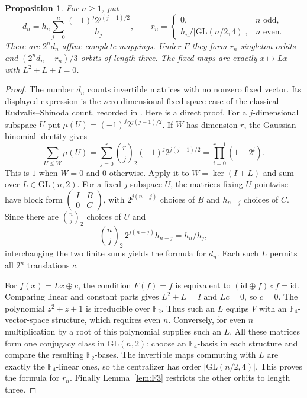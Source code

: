 \documentclass[11pt]{article}
\newtheorem{proposition}[theorem]{Proposition}
\begin{document}
\begin{proposition}\label{prop:F-affine}
For $n\ge1$, put
\[
d_n=h_n\sum_{j=0}^n\frac{(-1)^j2^{j(j-1)/2}}{h_j},\qquad
r_n=\begin{cases}
0,&n\text{ odd},\\
h_n/|\mathrm{GL}(n/2,4)|,&n\text{ even}.
\end{cases}
\]
There are $2^n d_n$ affine complete mappings.
Under $F$ they form $r_n$ singleton orbits and
$(2^n d_n-r_n)/3$ orbits of length three.
The fixed maps are exactly $x\mapsto Lx$ with $L^2+L+I=0$.
\end{proposition}
\begin{proof}
The number $d_n$ counts invertible matrices with no nonzero fixed vector.
Its displayed expression is the zero-dimensional fixed-space case of the
classical Rudvalis--Shinoda count, recorded in \cite[Theorem~2.1]{FS15}.
Here is a direct proof. For a $j$-dimensional subspace $U$ put
$\mu(U)=(-1)^j2^{j(j-1)/2}$. If $W$ has dimension $r$, the
Gaussian-binomial identity gives
\[
\sum_{U\le W}\mu(U)
=\sum_{j=0}^r\binom rj_2(-1)^j2^{j(j-1)/2}
=\prod_{i=0}^{r-1}(1-2^i).
\]
This is $1$ when $W=0$ and $0$ otherwise. Apply it to
$W=\ker(I+L)$ and sum over $L\in\mathrm{GL}(n,2)$.
For a fixed $j$-subspace $U$, the matrices fixing $U$ pointwise have block
form $\left(\begin{smallmatrix}I&B\\0&C\end{smallmatrix}\right)$,
with $2^{j(n-j)}$ choices of $B$ and $h_{n-j}$ choices of $C$.
Since there are $\binom nj_2$ choices of $U$ and
\[
\binom nj_2\,2^{j(n-j)}h_{n-j}=h_n/h_j,
\]
interchanging the two finite sums yields the formula for $d_n$.
Each such $L$ permits all $2^n$ translations $c$.

For $f(x)=Lx\oplus c$, the condition $F(f)=f$ is equivalent to
$(\mathrm{id}\oplus f)\circ f=\mathrm{id}$. Comparing linear and
constant parts gives $L^2+L=I$ and $Lc=0$, so $c=0$.
The polynomial $z^2+z+1$ is irreducible over $\mathbb F_2$.
Thus such an $L$ equips $V$ with an $\mathbb F_4$-vector-space structure,
which requires even $n$. Conversely, for even $n$ multiplication by a
root of this polynomial supplies such an $L$.
All these matrices form one conjugacy class in $\mathrm{GL}(n,2)$:
choose an $\mathbb F_4$-basis in each structure and compare the resulting
$\mathbb F_2$-bases. The invertible maps commuting with $L$ are exactly
the $\mathbb F_4$-linear ones, so the centralizer has order
$|\mathrm{GL}(n/2,4)|$. This proves the formula for $r_n$.
Finally Lemma~\ref{lem:F3} restricts the other orbits to length three.
\end{proof}
\end{document}
